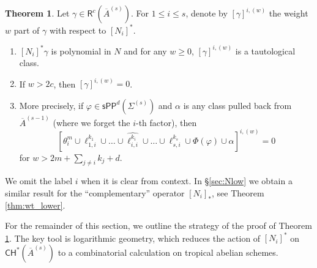 \documentclass[11pt]{article}
\def\CH{\mathsf{CH}}
\def\R{\mathsf{R}}
\newcommand{\barA}{\overline{A}}
\newcommand{\sPP}{\mathsf{sPP}}
\newcommand{\spp}{\sPP}
\theoremstyle{definition}
\newtheorem{theorem}[definition]{Theorem}
\begin{document}
\begin{theorem}\label{thm:wt}
    Let $\gamma \in \R^{c}(\barA^{(s)})$.
    For $1\le i \le s$, denote by $[\gamma]^{i,(w)}$ the weight $w$ part of $\gamma$ with respect to $[N_i]^{\ast}$.
	\begin{enumerate}[label = (\alph*)]
		\item $[N_i]^* \gamma$ is polynomial in $N$ and for any $w \ge 0$, $[\gamma]^{i,(w)}$ is a tautological class.
		\item If $w>2c$, then $[\gamma]^{i,(w)} = 0$.
		\item More precisely, if $\varphi \in \spp^{d}(\Sigma^{(s)})$ and $\alpha$ is any class pulled back from $\barA^{(s-1)}$ (where we forget the $i$-th factor), then
			$$\left[\theta_i^{m}\cup\ell_{1,i}^{k_1}\cup\dots \cup\widehat{\ell_{i,i}^{k_i}}\cup\dots\cup\ell_{s,i}^{k_{s}}\cup\Phi(\varphi)\cup\alpha\right]^{i,(w)}=0$$
			for $w>2m+\sum_{j\neq i}k_j+d$.
	\end{enumerate}
\end{theorem}

We omit the label $i$ when it is clear from context. In \S \ref{sec:Nlow} we obtain a similar result for the ``complementary'' operator $[N_i]_*$, see Theorem \ref{thm:wt_lower}.

For the remainder of this section, we outline the strategy of the proof of Theorem \ref{thm:wt}.
The key tool is logarithmic geometry, which reduces the action of $[N_i]^{\ast}$ on $\CH^*(\barA^{(s)})$ to a combinatorial calculation on tropical abelian schemes.
\end{document}
